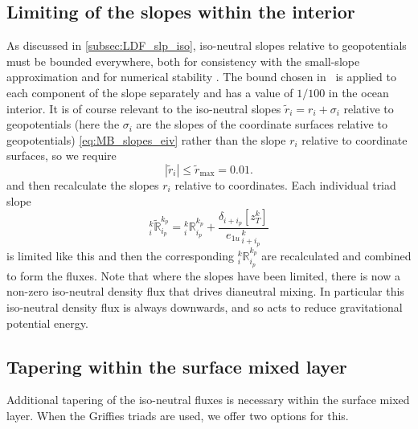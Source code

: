 \documentclass[../main/NEMO_manual]{subfiles}
\begin{document}
\subsection{ Limiting of the slopes within the interior}
\label{sec:TRIADS_limit}

As discussed in \autoref{subsec:LDF_slp_iso},
iso-neutral slopes relative to geopotentials must be bounded everywhere,
both for consistency with the small-slope approximation and for numerical stability \citep{cox_OM87, griffies_bk04}.
The bound chosen in \NEMO\ is applied to each component of the slope separately and
has a value of $1/100$ in the ocean interior.
It is of course relevant to the iso-neutral slopes $\tilde{r}_i=r_i+\sigma_i$ relative to geopotentials
(here the $\sigma_i$ are the slopes of the coordinate surfaces relative to geopotentials)
\autoref{eq:MB_slopes_eiv} rather than the slope $r_i$ relative to coordinate surfaces, so we require
\[
  |\tilde{r}_i|\leq \tilde{r}_\mathrm{max}=0.01.
\]
and then recalculate the slopes $r_i$ relative to coordinates.
Each individual triad slope
\begin{equation}
  \label{eq:TRIADS_Rtilde}
  _i^k\tilde{\mathbb{R}}_{i_p}^{k_p} = {}_i^k\mathbb{R}_{i_p}^{k_p}  + \frac{\delta_{i+i_p}[z_T^k]}{{e_{1u}}_{\,i + i_p}^{\,k}}
\end{equation}
is limited like this and then the corresponding $_i^k\mathbb{R}_{i_p}^{k_p} $ are recalculated and
combined to form the fluxes.
Note that where the slopes have been limited, there is now a non-zero iso-neutral density flux that
drives dianeutral mixing.
In particular this iso-neutral density flux is always downwards,
and so acts to reduce gravitational potential energy.

\subsection{Tapering within the surface mixed layer}
\label{sec:TRIADS_taper}

Additional tapering of the iso-neutral fluxes is necessary within the surface mixed layer.
When the Griffies triads are used, we offer two options for this.

\end{document}
